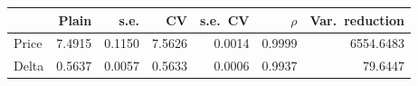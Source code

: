 \begin{tabular}{lrrrrrr}
\toprule
 & Plain & s.e. & CV & s.e.\ CV & $\rho$ & Var.\ reduction \\
\midrule
Price & 7.4915 & 0.1150 & 7.5626 & 0.0014 & 0.9999 & 6554.6483 \\
Delta & 0.5637 & 0.0057 & 0.5633 & 0.0006 & 0.9937 & 79.6447 \\
\bottomrule
\end{tabular}

